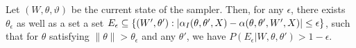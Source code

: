 \begin{proposition}
  Let $(W, \theta, \vartheta)$ be the current state of the sampler.
Then, for any $\epsilon$, there exists $\theta_\epsilon$ as well as a set a set $E_\epsilon \subseteq \{(W', \theta'): |\alpha_I(\theta,\theta',X) - \alpha(\theta,\theta',W',X)| \le \epsilon\}$, such that for $\theta$ satisfying $\| \theta \| > \theta_\epsilon$ and any $\theta'$, we have
$P(E_\epsilon|W,\theta,\theta') > 1-\epsilon$.
\label{prop:mix0}
\end{proposition}
